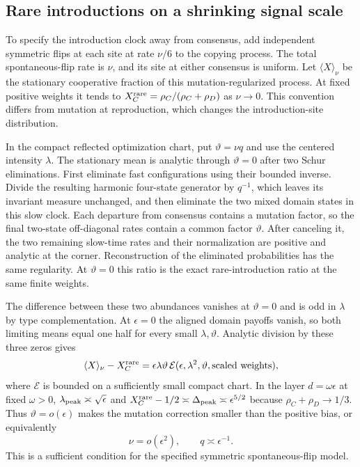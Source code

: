 \documentclass[aps,pre,reprint,amsmath,amssymb,longbibliography]{revtex4-2}
\begin{document}
\subsection{Rare introductions on a shrinking signal scale}
\label{app:v7-rare-signal}

To specify the introduction clock away from consensus, add independent
symmetric flips at each site at rate $\nu/6$ to the copying
process. The total spontaneous-flip rate is $\nu$, and its site
at either consensus is uniform. Let $\langle X\rangle_\nu$ be the
stationary cooperative fraction of this mutation-regularized process.
At fixed positive weights it tends to
$X_C^{\rm rare}=\rho_C/(\rho_C+\rho_D)$ as $\nu\to0$.
This convention differs from mutation at reproduction, which changes
the introduction-site distribution.

In the compact reflected optimization chart, put
$\vartheta=\nu q$ and use the centered intensity $\lambda$.
The stationary mean is analytic through $\vartheta=0$ after two
Schur eliminations. First eliminate fast configurations using their
bounded inverse. Divide the resulting harmonic four-state generator by $q^{-1}$,
which leaves its invariant measure unchanged, and then eliminate the
two mixed domain states in this slow clock. Each departure from consensus
contains a mutation factor, so the final two-state off-diagonal
rates contain a common factor $\vartheta$. After canceling it, the two remaining slow-time rates and their
normalization are positive and analytic at the corner. Reconstruction of the eliminated probabilities has the
same regularity. At $\vartheta=0$ this ratio is the exact
rare-introduction ratio at the same finite weights.

The difference between these two abundances vanishes at
$\vartheta=0$ and is odd in $\lambda$ by type complementation.
At $\epsilon=0$ the aligned domain payoffs vanish, so both limiting
means equal one half for every small $\lambda,\vartheta$.
Analytic division by these three zeros gives
\begin{equation}
 \langle X\rangle_\nu-X_C^{\rm rare}
 =\epsilon\lambda\vartheta\,
 \mathcal E(\epsilon,\lambda^2,\vartheta,\text{scaled weights}),
 \label{eq:v7-rare-signal-error}
\end{equation}
where $\mathcal E$ is bounded on a sufficiently small compact chart.
In the layer $d=\omega\epsilon$ at fixed $\omega>0$,
$\lambda_{\rm peak}\asymp\sqrt\epsilon$ and
$X_C^{\rm rare}-1/2\asymp\Delta_{\rm peak}
\asymp\epsilon^{5/2}$ because $\rho_C+\rho_D\to1/3$.
Thus $\vartheta=o(\epsilon)$ makes the mutation correction smaller
than the positive bias, or equivalently
\begin{equation}
 \nu=o(\epsilon^2),\qquad q\asymp\epsilon^{-1}.
 \label{eq:v7-rare-signal-condition}
\end{equation}
This is a sufficient condition for the specified symmetric
spontaneous-flip model.
\end{document}
